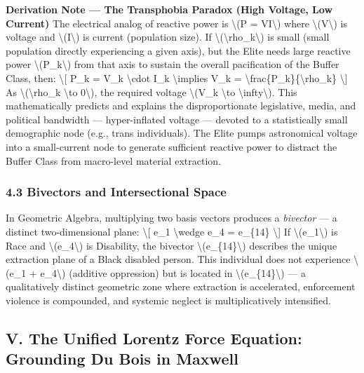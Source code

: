 {\textbf{Derivation Note --- The Transphobia Paradox (High Voltage, Low
Current)} The electrical analog of reactive power is \textbackslash(P =
VI\textbackslash) where \textbackslash(V\textbackslash) is voltage and
\textbackslash(I\textbackslash) is current (population size). If
\textbackslash(\textbackslash rho\_k\textbackslash) is small (small
population directly experiencing a given axis), but the Elite needs
large reactive power \textbackslash(P\_k\textbackslash) from that axis
to sustain the overall pacification of the Buffer Class, then:
\textbackslash{[} P\_k = V\_k \textbackslash cdot I\_k
\textbackslash implies V\_k =
\textbackslash frac\{P\_k\}\{\textbackslash rho\_k\} \textbackslash{]}
As \textbackslash(\textbackslash rho\_k \textbackslash to
0\textbackslash), the required voltage \textbackslash(V\_k
\textbackslash to \textbackslash infty\textbackslash). This
mathematically predicts and explains the disproportionate legislative,
media, and political bandwidth --- hyper-inflated voltage --- devoted to
a statistically small demographic node (e.g., trans individuals). The
Elite pumps astronomical voltage into a small-current node to generate
sufficient reactive power to distract the Buffer Class from macro-level
material extraction.

\subsubsection{4.3 Bivectors and Intersectional
Space}\label{bivectors-and-intersectional-space}

In Geometric Algebra, multiplying two basis vectors produces a
\emph{bivector} --- a distinct two-dimensional plane: \textbackslash{[}
e\_1 \textbackslash wedge e\_4 = e\_\{14\} \textbackslash{]} If
\textbackslash(e\_1\textbackslash) is Race and
\textbackslash(e\_4\textbackslash) is Disability, the bivector
\textbackslash(e\_\{14\}\textbackslash) describes the unique extraction
plane of a Black disabled person. This individual does not experience
\textbackslash(e\_1 + e\_4\textbackslash) (additive oppression) but is
located in \textbackslash(e\_\{14\}\textbackslash) --- a qualitatively
distinct geometric zone where extraction is accelerated, enforcement
violence is compounded, and systemic neglect is multiplicatively
intensified.

\protect{}\label{sec-lorentz}
\subsection{V. The Unified Lorentz Force Equation: Grounding Du Bois in
Maxwell}\label{v.-the-unified-lorentz-force-equation-grounding-du-bois-in-maxwell}

}

